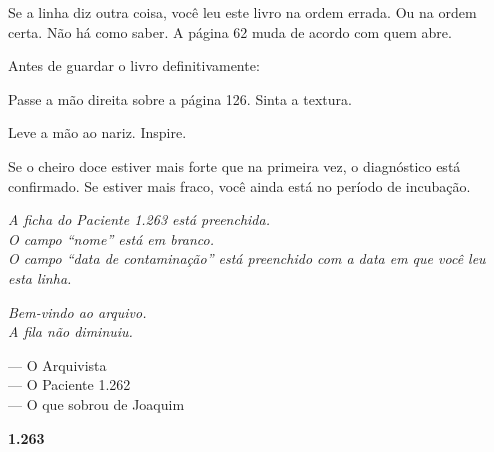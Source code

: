 \noindent Se a linha diz outra coisa, você leu este livro na ordem errada. Ou na ordem certa. Não há como saber. A página 62 muda de acordo com quem abre.

\vspace{1em}
\noindent Antes de guardar o livro definitivamente:

\noindent Passe a mão direita sobre a página 126. Sinta a textura.

\noindent Leve a mão ao nariz. Inspire.

\noindent Se o cheiro doce estiver mais forte que na primeira vez, o diagnóstico está confirmado. Se estiver mais fraco, você ainda está no período de incubação.

\vspace{1.5em}
\begin{center}
\textit{A ficha do Paciente 1.263 está preenchida.}\\
\textit{O campo ``nome'' está em branco.}\\
\textit{O campo ``data de contaminação'' está preenchido com a data em que você leu esta linha.}

\vspace{1.5em}
\textit{Bem-vindo ao arquivo.}\\
\textit{A fila não diminuiu.}

\vspace{1.5em}
--- O Arquivista\\
--- O Paciente 1.262\\
--- O que sobrou de Joaquim

\vspace{2em}
\textbf{1.263}
\end{center}

\clearpage
